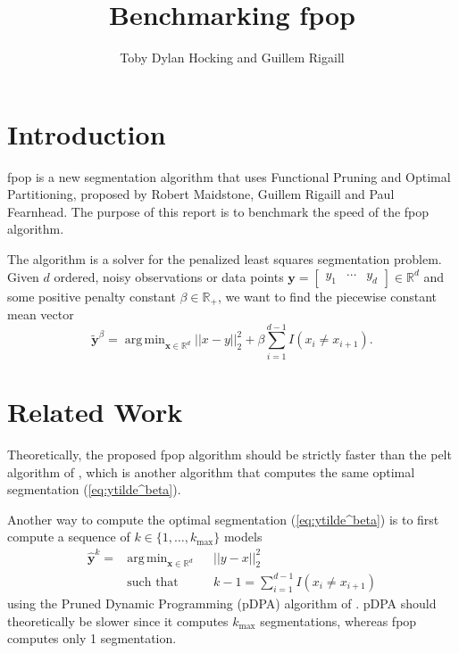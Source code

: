 \documentclass{article}
\DeclareMathOperator*{\argmin}{arg\,min}
\newcommand{\RR}{\mathbb R}
\begin{document}
\title{Benchmarking fpop}
\author{Toby Dylan Hocking and Guillem Rigaill}
\maketitle

\tableofcontents

\section{Introduction}

fpop is a new segmentation algorithm that uses Functional Pruning and
Optimal Partitioning, proposed by Robert Maidstone, Guillem Rigaill
and Paul Fearnhead. The purpose of this report is to benchmark the
speed of the fpop algorithm. 

The algorithm is a solver for the penalized least squares segmentation
problem. Given $d$ ordered, noisy observations or data points
$\mathbf y = \left[
\begin{array}{ccc}
y_1 & \cdots & y_d  
\end{array}
\right]\in\RR^d $ and some positive penalty constant
$\beta\in\RR_+$, we want to find the piecewise constant mean vector
\begin{equation}
  \label{eq:ytilde^beta}
  \mathbf{\tilde y}^\beta =
  \argmin_{\mathbf x\in\RR^d} ||x-y||^2_2 + 
  \beta \sum_{i=1}^{d-1} I(x_i \neq x_{i+1}).
\end{equation}

\section{Related Work}

Theoretically, the proposed fpop algorithm should be strictly faster
than the pelt algorithm of \citet{pelt}, which is another algorithm
that computes the same optimal segmentation  (\ref{eq:ytilde^beta}).

Another way to compute the optimal segmentation (\ref{eq:ytilde^beta})
is to first compute a sequence of $k\in\{1, \dots, k_{\text{max}}\}$
models
\begin{equation}
  \label{eq:yhat^k}
  \begin{aligned}
    \mathbf{\hat y}^k = &\argmin_{\mathbf x\in\RR^d} && ||y-x||^2_2\\
    &\text{such that} && k-1=\sum_{i=1}^{d-1} I(x_i \neq x_{i+1})
  \end{aligned}
\end{equation}
using the Pruned Dynamic Programming (pDPA) algorithm of
\citet{pruned-dp}. pDPA should theoretically be slower since it
computes $k_{\text{max}}$ segmentations, whereas fpop computes only 1
segmentation.
\end{document}
